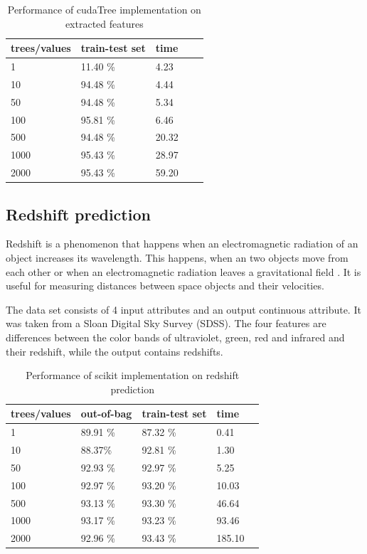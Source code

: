 \documentclass[thesis=B,english]{FITthesis}[2012/10/20]
\begin{document}
\begin{table}[h]
\begin{tabular}{|l|l|l|l|l|}
\hline
trees/values & train-test set & time \\ \hline
1            & 11.40 \%              & 4.23      \\ \hline
10           & 94.48 \%              & 4.44      \\ \hline
50           & 94.48 \%              & 5.34      \\ \hline
100          & 95.81 \%              & 6.46      \\ \hline
500          & 94.48 \%              & 20.32     \\ \hline
1000         & 95.43 \%              & 28.97     \\ \hline
2000         & 95.43 \%              & 59.20     \\ \hline
\end{tabular}
\caption{Performance of cudaTree implementation on extracted features}
\label{tab:cuda-extracted}
\end{table}

\subsection{Redshift prediction}
Redshift is a phenomenon that happens when an electromagnetic radiation of an object increases its wavelength. This happens, when an two objects move from each other or when an electromagnetic radiation leaves a gravitational field \cite{}. It is useful for measuring distances between space objects and their velocities. 

The data set consists of 4 input attributes and an output continuous attribute. It was taken from a Sloan Digital Sky Survey (SDSS).  The four features are differences between the color bands of ultraviolet, green, red and infrared and their redshift, while the output contains redshifts.
\begin{table}[h]
\begin{tabular}{|l|l|l|l|l|}
\hline
trees/values & out-of-bag & train-test set & time \\ \hline
1            &89.91 \%                   &87.32 \%                & 0.41          \\ \hline
10           &88.37\%                    &92.81 \%                &1.30           \\ \hline
50           &92.93 \%                   &92.97 \%                &5.25        \\ \hline
100          &92.97 \%                   &93.20 \%                &10.03        \\ \hline
500          &93.13 \%                   &93.30 \%                &46.64      \\ \hline
1000         &93.17 \%                   &93.23 \%                &93.46         \\ \hline
2000         &92.96 \%                   &93.43 \%                &185.10        \\ \hline
\end{tabular}
\caption{Performance of scikit implementation on redshift prediction}
\label{tab:scikit-redshift}
\end{table}
\end{document}
